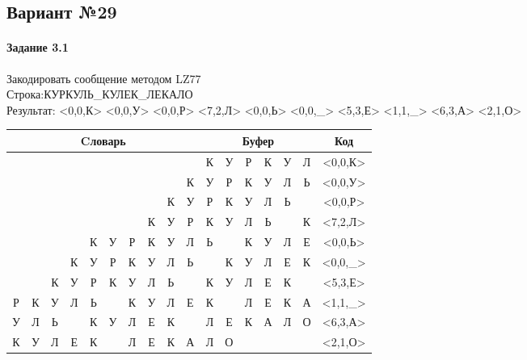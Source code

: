 \documentclass[a4paper, 12pt]{article}
\begin{document}
\pagebreak
\subsection{Вариант №29}
\paragraph{Задание 3.1}

Закодировать сообщение методом LZ77\\
Строка:КУРКУЛЬ\_КУЛЕК\_ЛЕКАЛО\\
Результат: <0,0,К> <0,0,У> <0,0,Р> <7,2,Л> <0,0,Ь> <0,0,\_> <5,3,Е> <1,1,\_> <6,3,А> <2,1,О>\\
\begin{table}[h!]
\centering
\begin{tabular}{|c|c|c|c|c|c|c|c|c|c|c|c|c|c|c|c|c|} 
\hline
\multicolumn{10}{|c|}{Cловарь} & \multicolumn{6}{c|}{Буфер} & Код  \\ \hline
  &   &   &   &   &   &   &   &   &   & \cellcolor[HTML]{8CE4F6} К & У & Р & К & У & Л & <0,0,К>
\\ \hline
  &   &   &   &   &   &   &   &   & К & \cellcolor[HTML]{8CE4F6} У & Р & К & У & Л & Ь & <0,0,У>
\\ \hline
  &   &   &   &   &   &   &   & К & У & \cellcolor[HTML]{8CE4F6} Р & К & У & Л & Ь &   & <0,0,Р>
\\ \hline
  &   &   &   &   &   &   & \cellcolor[HTML]{FFFF00} К & \cellcolor[HTML]{FFFF00} У & Р & \cellcolor[HTML]{FFFF00} К & \cellcolor[HTML]{FFFF00} У & \cellcolor[HTML]{8CE4F6} Л & Ь &   & К & <7,2,Л>
\\ \hline
  &   &   &   & К & У & Р & К & У & Л & \cellcolor[HTML]{8CE4F6} Ь &   & К & У & Л & Е & <0,0,Ь>
\\ \hline
  &   &   & К & У & Р & К & У & Л & Ь & \cellcolor[HTML]{8CE4F6}   & К & У & Л & Е & К & <0,0,\_>
\\ \hline
  &   & К & У & Р & \cellcolor[HTML]{FFFF00} К & \cellcolor[HTML]{FFFF00} У & \cellcolor[HTML]{FFFF00} Л & Ь &   & \cellcolor[HTML]{FFFF00} К & \cellcolor[HTML]{FFFF00} У & \cellcolor[HTML]{FFFF00} Л & \cellcolor[HTML]{8CE4F6} Е & К &   & <5,3,Е>
\\ \hline
Р & \cellcolor[HTML]{FFFF00} К & У & Л & Ь &   & К & У & Л & Е & \cellcolor[HTML]{FFFF00} К & \cellcolor[HTML]{8CE4F6}   & Л & Е & К & А & <1,1,\_>
\\ \hline
У & Л & Ь &   & К & У & \cellcolor[HTML]{FFFF00} Л & \cellcolor[HTML]{FFFF00} Е & \cellcolor[HTML]{FFFF00} К &   & \cellcolor[HTML]{FFFF00} Л & \cellcolor[HTML]{FFFF00} Е & \cellcolor[HTML]{FFFF00} К & \cellcolor[HTML]{8CE4F6} А & Л & О & <6,3,А>
\\ \hline
К & У & \cellcolor[HTML]{FFFF00} Л & Е & К &   & Л & Е & К & А & \cellcolor[HTML]{FFFF00} Л & \cellcolor[HTML]{8CE4F6} О &   &   &   &   & <2,1,О>
\\ \hline
\end{tabular}
\end{table}
\end{document}
